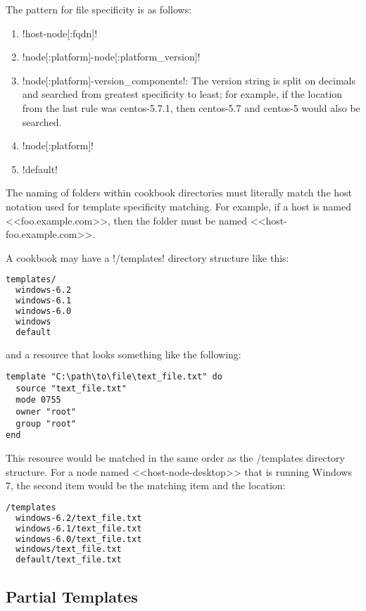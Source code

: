 The pattern for file specificity is as follows:

\begin{enumerate}
  \item \inline!host-node[:fqdn]!
  \item \inline!node[:platform]-node[:platform_version]!
  \item \inline!node[:platform]-version_components!: The version string is split on decimals and searched from greatest specificity to least; for example, if the location from the last rule was centos-5.7.1, then centos-5.7 and centos-5 would also be searched.
  \item \inline!node[:platform]!
  \item \inline!default!
\end{enumerate}

The naming of folders within cookbook directories must literally match the host notation used for template specificity matching. For example, if a host is named <<foo.example.com>>, then the folder must be named <<host-foo.example.com>>.

A cookbook may have a \inline!/templates! directory structure like this:

\begin{lstlisting}[language=Bash,label=lst:cookbook-templates7]
templates/
  windows-6.2
  windows-6.1
  windows-6.0
  windows
  default
\end{lstlisting}

and a resource that looks something like the following:

\begin{lstlisting}[label=lst:cookbook-templates8]
template "C:\path\to\file\text_file.txt" do
  source "text_file.txt"
  mode 0755
  owner "root"
  group "root"
end
\end{lstlisting}

This resource would be matched in the same order as the /templates directory structure. For a node named <<host-node-desktop>> that is running Windows 7, the second item would be the matching item and the location:

\begin{lstlisting}[language=Bash,label=lst:cookbook-templates9]
/templates
  windows-6.2/text_file.txt
  windows-6.1/text_file.txt
  windows-6.0/text_file.txt
  windows/text_file.txt
  default/text_file.txt
\end{lstlisting}

\subsection{Partial Templates}

